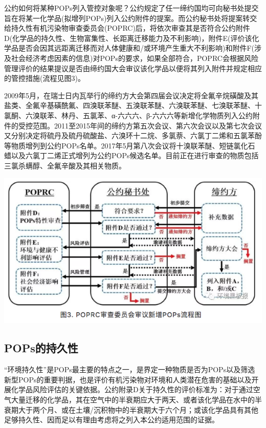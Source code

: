 \documentclass[]{book}
\begin{document}
公约如何将某种POPs列入管控对象呢？公约规定了任一缔约国均可向秘书处提交旨在将某一化学品(拟增列POPs)列入公约附件的提案。而公约秘书处将提案转交给持久性有机污染物审查委员会(POPRC)后，将依次审查其是否符合公约附件D(化学品的持久性、生物富集性、长距离迁移能力及不利影响)，附件E(评价该化学品是否会因其远距离迁移而对人体健康和/或环境产生重大不利影响)和附件F(涉及社会经济考虑因素的信息)对POPs的要求，如果全部符合，POPRC会根据风险管理评价的结果提议是否由缔约国大会审议该化学品以便将其列入附件并规定相应的管控措施(流程见图3)。

2009年5月，在瑞士日内瓦举行的缔约方大会第四届会议决定将全氟辛烷磺酸及其盐类、全氟辛基磺酰氟、四溴联苯醚、五溴联苯醚、六溴联苯醚、七溴联苯醚、十氯酮、六溴联苯、林丹、五氯苯、α-六六六、β-六六六等新增化学物质列入公约附件的受控范围。2011至2015年间的缔约方第五次会议、第六次会议以及第七次会议又分别决定将硫丹及硫丹硫酸盐、六溴环十二烷、多氯萘、六氯丁二烯和五氯苯酚等物质增列到公约POPs名单。2017年5月第八次会议将十溴联苯醚、短链氯化石蜡以及六氯丁二烯正式增列为公约POPs候选名单。目前正在进行审查的物质包括三氯杀螨醇、全氟辛酸及其相关物质。

\includegraphics[width=8.33in]{images/gongyue3}

\subsection{POPs的持久性}\label{pops}

``环境持久性''是POPs最主要的特点之一，是界定一种物质是否为POPs以及筛选新型POPs的重要判据，也是评价有机污染物对环境和人类潜在危害的基础以及开展化学品风险评估的关键依据。公约附录D关于持久性的评价标准为：对于通过空气大量迁移的化学品，其在空气中的半衰期应大于两天、或者该化学品在水中的半衰期大于两个月、或在土壤/沉积物中的半衰期大于六个月；或该化学品具有其他足够持久性、因而足以有理由考虑将之列入本公约适用范围的证据。
\end{document}
